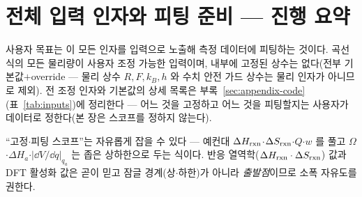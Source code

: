 \section{전체 입력 인자와 피팅 준비 --- 진행 요약}\label{sec:inputs}
사용자 목표는 이 모든 인자를 입력으로 노출해 측정 데이터에 피팅하는 것이다. 곡선식의 모든 물리량이 사용자
조정 가능한 입력이며, 내부에 고정된 상수는 없다(전부 기본값$+$override --- 물리 상수 $R,F,k_B,h$ 와
수치 안전 가드 상수는 물리 인자가 아니므로 제외). 전 조정 인자와 기본값의 상세
목록은 부록~\ref{sec:appendix-code}(표~\ref{tab:inputs})에 정리한다 --- 어느 것을 고정하고 어느 것을
피팅할지는 사용자가 데이터로 정한다(본 장은 스코프를 정하지 않는다).

``고정$\cdot$피팅 스코프''는 자유롭게 잡을 수 있다 --- 예컨대
$\Delta H_{\mathrm{rxn}}$$\cdot$$\Delta S_{\mathrm{rxn}}$$\cdot$$Q$$\cdot$$w$ 를 풀고 $\Omega$$\cdot$$\Delta H_a$$\cdot$$|\dd V/\dd q|_{q_a}$
는 좁은 상하한으로 두는 식이다. 반응 열역학($\Delta H_{\mathrm{rxn}}\cdot\Delta S_{\mathrm{rxn}}$) 값과 DFT 활성화 값은 곧이
믿고 잠글 경계(상$\cdot$하한)가 아니라 \emph{출발점}이므로 소폭 자유도를 권한다.

